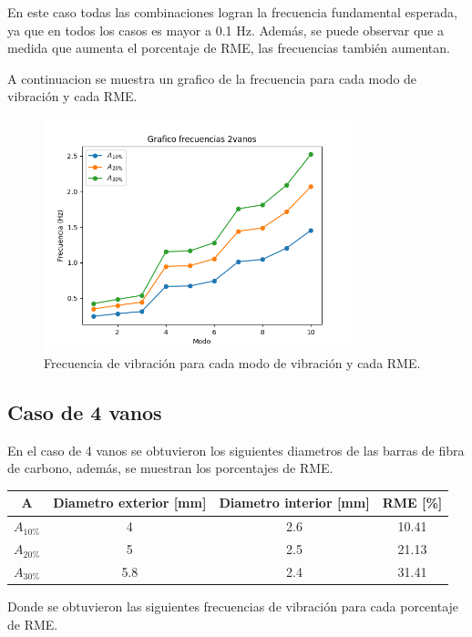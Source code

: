 En este caso todas las combinaciones logran la frecuencia fundamental esperada, ya que en todos los casos es mayor a 0.1 Hz. Además, se puede observar que a medida que aumenta el porcentaje de RME, las frecuencias también aumentan.

A continuacion se muestra un grafico de la frecuencia para cada modo de vibración y cada RME. 

\begin{figure}[H]
    \centering
    \includegraphics[width=0.8\textwidth]{../grafico_frecuencias_2vanos.png}
    \caption{Frecuencia de vibración para cada modo de vibración y cada RME.}
\end{figure}

\subsection{Caso de 4 vanos}
En el caso de 4 vanos se obtuvieron los siguientes diametros de las barras de fibra de carbono, además, se muestran los porcentajes de RME.

\begin{table}[H]
    \centering
    \begin{tabular}{cccc}
    \toprule
     A & Diametro exterior [mm] & Diametro interior [mm] & RME [\%] \\
    \midrule
     $A_{10\%}$ &  4 &  2.6 &  10.41 \\
     $A_{20\%}$ &  5 &  2.5 &  21.13 \\
     $A_{30\%}$ &  5.8 &  2.4 &  31.41 \\
    \bottomrule
    \end{tabular}
\end{table}

Donde se obtuvieron las siguientes frecuencias de vibración para cada porcentaje de RME.


